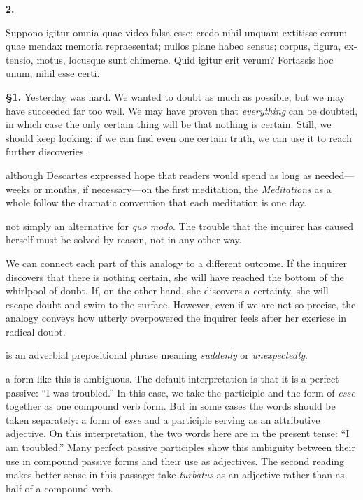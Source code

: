     \textbf{2.} \begin{latin}Suppono igitur omnia quae video falsa esse; credo nihil unquam extitisse eorum quae mendax memoria repraesentat; nullos plane habeo sensus; corpus, figura, extensio, motus, locusque sunt chimerae. Quid igitur erit verum? Fortassis hoc unum, nihil esse certi.\end{latin}
\pend
\endnumbering

\prenotes

\textbf{§1.} Yesterday was hard. We wanted to doubt as much as possible, but we may have succeeded far too well. We may have proven that \textit{everything} can be doubted, in which case the only certain thing will be that nothing is certain. Still, we should keep looking: if we can find even one certain truth, we can use it to reach further discoveries.

 although Descartes expressed hope that readers would spend as long as needed---weeks or months, if necessary---on the first meditation, the \textit{Meditations} as a whole follow the dramatic convention that each meditation is one day.

 not simply an alternative for \textit{quo modo}. The trouble that the inquirer has caused herself must be solved by reason, not in any other way.

 We can connect each part of this analogy to a different outcome. If the inquirer discovers that there is nothing certain, she will have reached the bottom of the whirlpool of doubt. If, on the other hand, she discovers a certainty, she will escape doubt and swim to the surface. However, even if we are not so precise, the analogy conveys how utterly overpowered the inquirer feels after her exericse in radical doubt.

 is an adverbial prepositional phrase meaning \textit{suddenly} or \textit{unexpectedly}.

 a form like this is ambiguous. The default interpretation is that it is a perfect passive: ``I was troubled.'' In this case, we take the participle and the form of \textit{esse} together as one compound verb form. But in some cases the words should be taken separately: a form of \textit{esse} and a participle serving as an attributive adjective. On this interpretation, the two words here are in the present tense: ``I am troubled.'' Many perfect passive participles show this ambiguity between their use in compound passive forms and their use as adjectives. The second reading makes better sense in this passage: take \textit{turbatus} as an adjective rather than as half of a compound verb.

